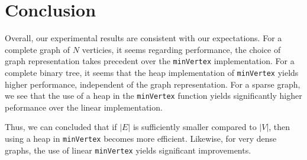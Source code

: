 \documentclass[technote]{IEEEtran}
\begin{document}


\section{Conclusion}
Overall, our experimental results are consistent with our expectations.
For a complete graph of $N$ verticies, it seems regarding performance, 
the choice of graph representation takes precedent over the \texttt{minVertex} implementation.
For a complete binary tree, it seems that the heap implementation of 
\texttt{minVertex} yields higher performance, independent of 
the graph representation.
For a sparse graph, we see that the use of a heap in the 
\texttt{minVertex} function yields significantly higher peformance over 
the linear implementation. 

Thus, we can concluded that if $|E|$ is sufficiently smaller compared to 
$|V|$, then using a heap in \texttt{minVertex} becomes more efficient. 
Likewise, for very dense graphs, the use of linear \texttt{minVertex} 
yields significant improvements.

\nocite{*}


\end{document}
